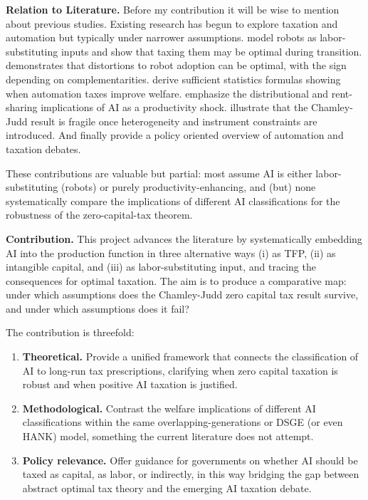 \medskip

\noindent \textbf{Relation to Literature.}  
Before my contribution it will be wise to mention about previous studies. Existing research has begun to explore taxation and automation but typically under narrower assumptions. \citet{GuerreiroRebeloTeles2022} model robots as labor-substituting inputs and show that taxing them may be optimal during transition. \citet{Thummel2023} demonstrates that distortions to robot adoption can be optimal, with the sign depending on complementarities. \citet{CostinotWerning2022} derive sufficient statistics formulas showing when automation taxes improve welfare. \citet{KorinekStiglitz2018, KorinekStiglitz2021} emphasize the distributional and rent-sharing implications of AI as a productivity shock. \citet{SaezStantcheva2016} illustrate that the Chamley-Judd result is fragile once heterogeneity and instrument constraints are introduced. And finally \citet{BastaniWaldenstrom2024} provide a policy oriented overview of automation and taxation debates.  

These contributions are valuable but partial: most assume AI is either labor-substituting (robots) or purely productivity-enhancing, and (but) none systematically compare the implications of different AI classifications for the robustness of the zero-capital-tax theorem.  

\medskip

\noindent \textbf{Contribution.}  
This project advances the literature by systematically embedding AI into the production function in three alternative ways (i) as TFP, (ii) as intangible capital, and (iii) as labor-substituting input, and tracing the consequences for optimal taxation. The aim is to produce a comparative map: under which assumptions does the Chamley-Judd zero capital tax result survive, and under which assumptions does it fail?  

The contribution is threefold:  
\begin{enumerate}
    \item \textbf{Theoretical.} Provide a unified framework that connects the classification of AI to long-run tax prescriptions, clarifying when zero capital taxation is robust and when positive AI taxation is justified.  
    \item \textbf{Methodological.} Contrast the welfare implications of different AI classifications within the same overlapping-generations or DSGE (or even HANK) model, something the current literature does not attempt.  
    \item \textbf{Policy relevance.} Offer guidance for governments on whether AI should be taxed as capital, as labor, or indirectly, in this way bridging the gap between abstract optimal tax theory and the emerging AI taxation debate.  
\end{enumerate}

